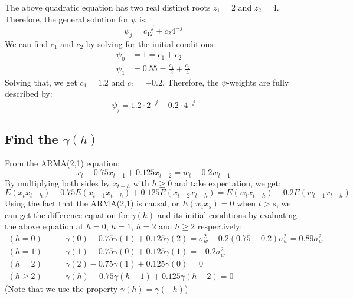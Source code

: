 The above quadratic equation has two real distinct roots $z_1 = 2$ and $z_2 = 4$. Therefore, the general solution for $\psi$ is:
\begin{equation}
\psi_j = c_12^{-j} + c_2 4^{-j}
\end{equation}
We can find $c_1$ and $c_2$ by solving for the initial conditions:
\begin{equation}
\begin{split}
\psi_0 &= 1 = c_1 + c_2 \\
\psi_1 &= 0.55 = \frac{c_1}{2} + \frac{c_2}{4}
\end{split}
\end{equation}
Solving that, we get $c_1 = 1.2$ and $c_2 = -0.2$. Therefore, the $\psi$-weights are fully described by:
\begin{equation}\label{eq:psi_weight}
\psi_j = 1.2 \cdot 2^{-j} - 0.2 \cdot 4^{-j}
\end{equation}

\subsection{Find the $\gamma(h)$}
From the ARMA(2,1) equation:
\begin{equation}
x_t - 0.75x_{t-1} + 0.125x_{t-2} = w_t -0.2w_{t-1}
\end{equation}
By multiplying both sides by $x_{t-h}$ with $h\geq 0$ and take expectation, we get:
\begin{equation}
E(x_tx_{t-h}) -0.75E(x_{t-1}x_{t-h})+0.125E(x_{t-2}x_{t-h}) = E(w_t x_{t-h}) - 0.2E(w_{t-1}x_{t-h})
\end{equation}
Using the fact that the ARMA(2,1) is causal, or $E(w_tx_s) = 0$ when $t > s$, we can get the difference equation for $\gamma(h)$ and its initial conditions by evaluating the above equation at $h = 0$, $h=1$, $h=2$ and $h \geq 2$ respectively:
\begin{equation}
\begin{split}
(h = 0) \qquad &\gamma(0) - 0.75\gamma(1) + 0.125\gamma(2) = \sigma_w^2 - 0.2(0.75-0.2)\sigma_w^2 = 0.89\sigma_w^2  \\
(h=1) \qquad &\gamma(1) - 0.75\gamma(0) + 0.125\gamma(1) = -0.2\sigma^2_w\\
(h=2) \qquad &\gamma(2) - 0.75\gamma(1) + 0.125\gamma(0) = 0 \\ 
(h\geq 2) \qquad & \gamma(h) - 0.75\gamma(h-1) +0.125\gamma(h-2)=0 
\end{split}
\end{equation}
(Note that we use the property $\gamma(h) = \gamma(-h)$)

